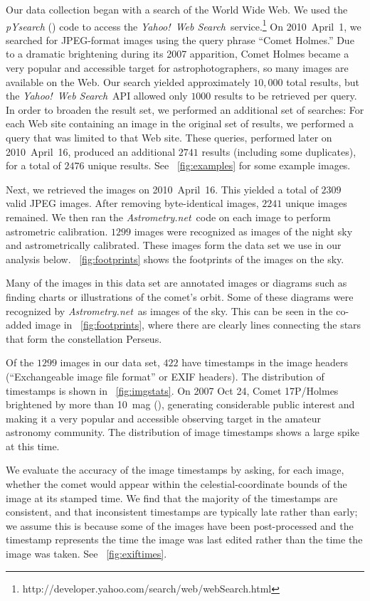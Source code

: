 \documentclass[12pt,preprint]{aastex}
\newcommand{\project}[1]{\textsl{#1}}
\newcommand{\An}{\project{Astrometry.net}}
\newcommand{\yahoo}{Yahoo!}
\newcommand{\YWS}{\project{\yahoo\ Web Search}}
\newcommand{\figref}[1]{\figurename~\ref{#1}}
\newcommand{\thou}{,\!000}
\begin{document}
Our data collection began with a search of the World Wide Web.  We
used the \mbox{\project{pYsearch}} (\citealt{pysearch}) code to access
the \YWS\ service.\footnote{%
  http://developer.yahoo.com/search/web/webSearch.html} On
2010~April~1, we searched for JPEG-format images using the query
phrase ``Comet Holmes.''  Due to a dramatic brightening during its
2007 apparition, Comet Holmes became a very popular and accessible
target for astrophotographers, so many images are available on the
Web.  Our search yielded approximately $10\thou$ total results, but
the \YWS\ API allowed only $1000$ results to be retrieved per query.
In order to broaden the result set, we performed an additional set of
searches: For each Web site containing an image in the original set of
results, we performed a query that was limited to that Web site.
These queries, performed later on 2010~April~16, produced an
additional $2741$ results (including some duplicates), for a total of
$2476$ unique results.  See \figref{fig:examples} for some example
images.

Next, we retrieved the images on 2010~April~16.  This yielded a total
of $2309$ valid JPEG images.  After removing byte-identical images,
$2241$ unique images remained.  We then ran the \An\ code on each
image to perform astrometric calibration.  $1299$ images were
recognized as images of the night sky and astrometrically calibrated.
These images form the data set we use in our analysis below.
\figref{fig:footprints} shows the footprints of the images on the sky.

Many of the images in this data set are annotated images or diagrams
such as finding charts or illustrations of the comet's orbit.  Some of
these diagrams were recognized by \An\ as images of the sky.  This can
be seen in the co-added image in \figref{fig:footprints}, where there
are clearly lines connecting the stars that form the constellation
Perseus.

Of the $1299$ images in our data set, $422$ have timestamps in the
image headers (``Exchangeable image file format'' or EXIF headers).
The distribution of timestamps is shown in \figref{fig:imgstats}.  On
2007 Oct 24, Comet 17P/Holmes brightened by more than 10~mag
(\citealt{outburst}), generating considerable public interest and
making it a very popular and accessible observing target in the
amateur astronomy community.  The distribution of image timestamps
shows a large spike at this time.

We evaluate the accuracy of the image timestamps by asking, for each
image, whether the comet would appear within the celestial-coordinate
bounds of the image at its stamped time.  We find that the majority of
the timestamps are consistent, and that inconsistent timestamps are
typically late rather than early; we assume this is because some of
the images have been post-processed and the timestamp represents the time the
image was last edited rather than the time the image was taken.  See
\figref{fig:exiftimes}.
\end{document}
